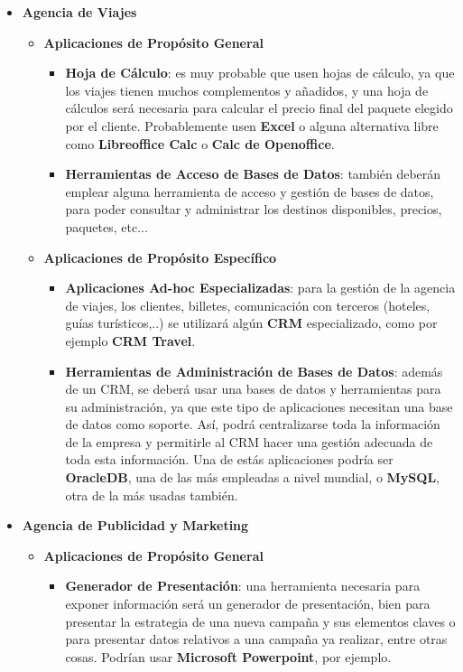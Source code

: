 \begin{itemize}
    \item \textbf{Agencia de Viajes}
    \begin{itemize}
        \item \textbf{Aplicaciones de Propósito General}
        \begin{itemize}
            \item \textbf{Hoja de Cálculo}: es muy probable que usen hojas de cálculo, ya que los viajes tienen muchos complementos y añadidos, y una hoja de cálculos será necesaria para calcular el precio final del paquete elegido por el cliente. Probablemente usen \textbf{Excel} o alguna alternativa libre como \textbf{Libreoffice Calc} o \textbf{Calc de Openoffice}.

            \item \textbf{Herramientas de Acceso de Bases de Datos}: también deberán emplear alguna herramienta de acceso y gestión de bases de datos, para poder consultar y administrar los destinos disponibles, precios, paquetes, etc...
        \end{itemize}

    \item \textbf{Aplicaciones de Propósito Específico}
    \begin{itemize}
        \item \textbf{Aplicaciones Ad-hoc Especializadas}: para la gestión de la agencia de viajes, los clientes, billetes, comunicación con terceros (hoteles, guías turísticos,..) se utilizará algún \textbf{CRM} especializado, como por ejemplo \textbf{CRM Travel}.

        \item \textbf{Herramientas de Administración de Bases de Datos}: además de un CRM, se deberá usar una bases de datos y herramientas para su administración, ya que este tipo de aplicaciones necesitan una base de datos como soporte. Así, podrá centralizarse toda la información de la empresa y permitirle al CRM hacer una gestión adecuada de toda esta información. Una de estás aplicaciones podría ser \textbf{OracleDB}, una de las más empleadas a nivel mundial, o \textbf{MySQL}, otra de la más usadas también.
    \end{itemize}

    \vspace{5ex}
    \end{itemize}

    \item \textbf{Agencia de Publicidad y Marketing}
    \begin{itemize}
        \item \textbf{Aplicaciones de Propósito General}
        \begin{itemize}
            \item \textbf{Generador de Presentación}: una herramienta necesaria para exponer información será un generador de presentación, bien para presentar la estrategia de una nueva campaña y sus elementos claves o para presentar datos relativos a una campaña ya realizar, entre otras cosas. Podrían usar \textbf{Microsoft Powerpoint}, por ejemplo.


\end{itemize}
\end{itemize}
\end{itemize}
